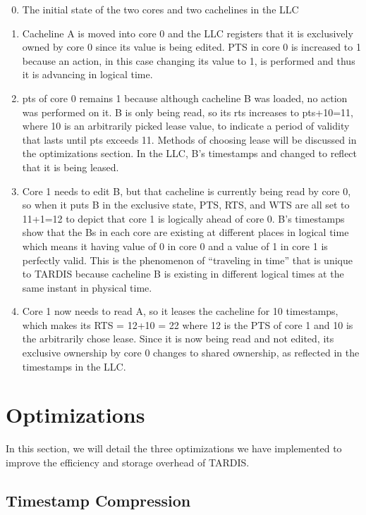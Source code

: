 \documentclass[12pt]{article}
\begin{document}
\begin{enumerate}
\setcounter{enumi}{-1}
	
\item The initial state of the two cores and two cachelines in the LLC
\item Cacheline A is moved into core 0 and the LLC registers that it is exclusively owned by core 0 since its value is being edited. PTS in core 0 is increased to 1 because an action, in this case changing its value to 1, is performed and thus it is advancing in logical time. 
\item pts of core 0 remains 1 because although cacheline B was loaded, no action was performed on it. B is only being read, so its rts increases to pts+10=11, where 10 is an arbitrarily picked lease value, to indicate a period of validity that lasts until pts exceeds 11. Methods of choosing lease will be discussed in the optimizations section. In the LLC, B’s timestamps and changed to reflect that it is being leased.
\item Core 1 needs to edit B, but that cacheline is currently being read by core 0, so when it puts B in the exclusive state, PTS, RTS, and WTS are all set to 11+1=12 to depict that core 1 is logically ahead of core 0. B’s timestamps show that the Bs in each core are existing at different places in logical time which means it having value of 0 in core 0 and a value of 1 in core 1 is perfectly valid. This is the phenomenon of “traveling in time” that is unique to TARDIS because cacheline B is existing in different logical times at the same instant in physical time. 
\item Core 1 now needs to read A, so it leases the cacheline for 10 timestamps, which makes its RTS = 12+10 = 22 where 12 is the PTS of core 1 and 10 is the arbitrarily chose lease. Since it is now being read and not edited, its exclusive ownership by core 0 changes to shared ownership, as reflected in the timestamps in the LLC.
\end{enumerate}

\section{Optimizations}

In this section, we will detail the three optimizations we  have implemented to improve the efficiency and storage overhead of TARDIS.

\subsection{Timestamp Compression}
\end{document}
